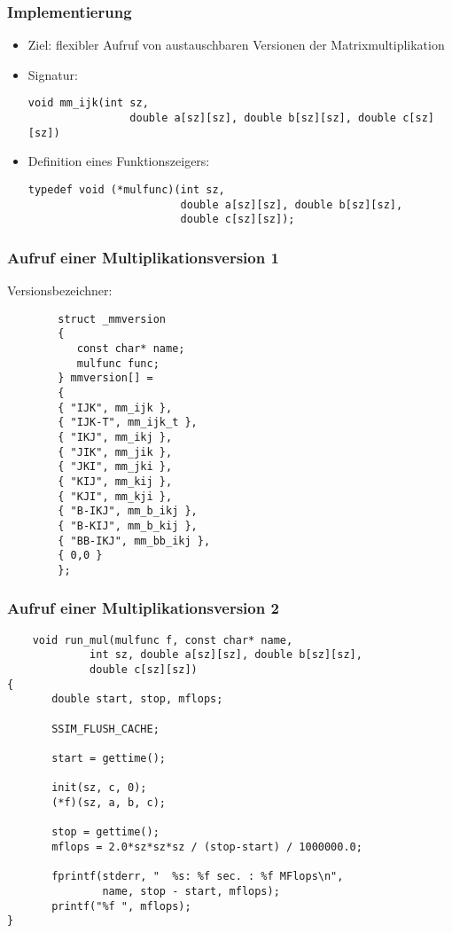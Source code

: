 
\begin{frame} [fragile] \frametitle{Implementierung}
	\begin{itemize}
	
	\item Ziel: flexibler Aufruf von austauschbaren Versionen der Matrixmultiplikation
	
	\item<2-> Signatur:
	\begin{lstlisting}[numbers=none]
	void mm_ijk(int sz,
	            double a[sz][sz], double b[sz][sz], double c[sz][sz])
	\end{lstlisting}
	
	\item<2-> Definition eines Funktionszeigers:
	\begin{lstlisting}[numbers=none]
	typedef void (*mulfunc)(int sz,
                        double a[sz][sz], double b[sz][sz],
                        double c[sz][sz]);
	\end{lstlisting}
	
	\end{itemize}
\end{frame}

\begin{frame} [fragile] \frametitle{Aufruf einer Multiplikationsversion 1}
	Versionsbezeichner:
		\begin{lstlisting}
		struct _mmversion
		{
		   const char* name;
		   mulfunc func;
		} mmversion[] =
		{
		{ "IJK", mm_ijk },
		{ "IJK-T", mm_ijk_t },
		{ "IKJ", mm_ikj },
		{ "JIK", mm_jik },
		{ "JKI", mm_jki },
		{ "KIJ", mm_kij },
		{ "KJI", mm_kji },
		{ "B-IKJ", mm_b_ikj },
		{ "B-KIJ", mm_b_kij },
		{ "BB-IKJ", mm_bb_ikj },
		{ 0,0 }
		};
		\end{lstlisting}
	
\end{frame}

\begin{frame} [fragile] \frametitle{Aufruf einer Multiplikationsversion 2}
	\begin{lstlisting}
	void run_mul(mulfunc f, const char* name,
             int sz, double a[sz][sz], double b[sz][sz],
             double c[sz][sz])
{
	   double start, stop, mflops;

	   SSIM_FLUSH_CACHE;
	   
	   start = gettime();
	   
	   init(sz, c, 0);
	   (*f)(sz, a, b, c);
	   
	   stop = gettime();
	   mflops = 2.0*sz*sz*sz / (stop-start) / 1000000.0;
	   
	   fprintf(stderr, "  %s: %f sec. : %f MFlops\n", 
	           name, stop - start, mflops);
	   printf("%f ", mflops);
}
	\end{lstlisting}
\end{frame}

